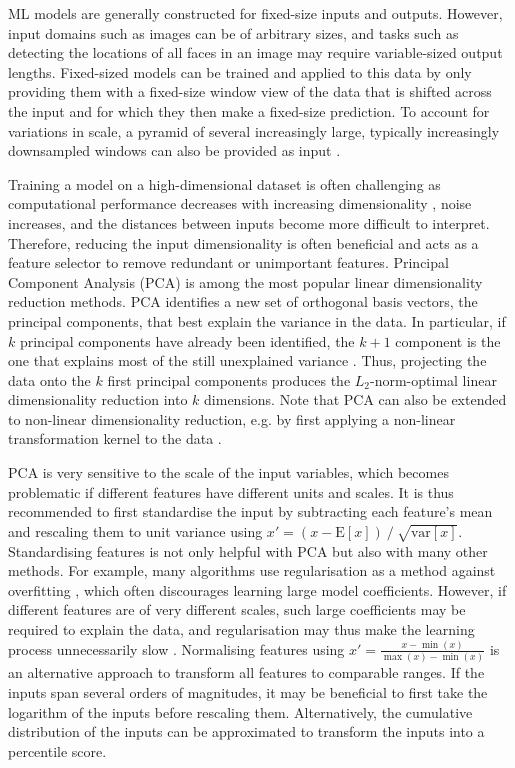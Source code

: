 \newpar ML models are generally constructed for fixed-size inputs and outputs. However, input domains such as images can be of arbitrary sizes, and tasks such as detecting the locations of all faces in an image may require variable-sized output lengths. Fixed-sized models can be trained and applied to this data by only providing them with a fixed-size window view of the data that is shifted across the input and for which they then make a fixed-size prediction. To account for variations in scale, a pyramid of several increasingly large, typically increasingly downsampled windows can also be provided as input \cite{feature-pyramid-1984}.

Training a model on a high-dimensional dataset is often challenging as computational performance decreases with increasing dimensionality \cite{ml-pattern-2006}, noise increases, and the distances between inputs become more difficult to interpret. Therefore, reducing the input dimensionality is often beneficial and acts as a feature selector to remove redundant or unimportant features. Principal Component Analysis (PCA) is among the most popular linear dimensionality reduction methods. PCA identifies a new set of orthogonal basis vectors, the principal components, that best explain the variance in the data. In particular, if $k$ principal components have already been identified, the $k+1$ component is the one that explains most of the still unexplained variance \cite{pca-1901}. Thus, projecting the data onto the $k$ first principal components produces the $L_2$-norm-optimal linear dimensionality reduction into $k$ dimensions. Note that PCA can also be extended to non-linear dimensionality reduction, e.g. by first applying a non-linear transformation kernel to the data \cite{kernel-pca-1997}.

PCA is very sensitive to the scale of the input variables, which becomes problematic if different features have different units and scales. It is thus recommended to first standardise the input by subtracting each feature's mean and rescaling them to unit variance using $x' = (x - \text{E}[x]) \mathbin{/} \sqrt{\text{var}[x]}$. Standardising features is not only helpful with PCA but also with many other methods. For example, many algorithms use regularisation as a method against overfitting \cite{statistical-learning-2009}, which often discourages learning large model coefficients. However, if different features are of very different scales, such large coefficients may be required to explain the data, and regularisation may thus make the learning process unnecessarily slow \cite{data-preprocessing-2007}. Normalising features using $x' = \frac{x - \min(x)}{\max(x) - \min(x)}$ is an alternative approach to transform all features to comparable ranges. If the inputs span several orders of magnitudes, it may be beneficial to first take the logarithm of the inputs before rescaling them. Alternatively, the cumulative distribution of the inputs can be approximated to transform the inputs into a percentile score.

